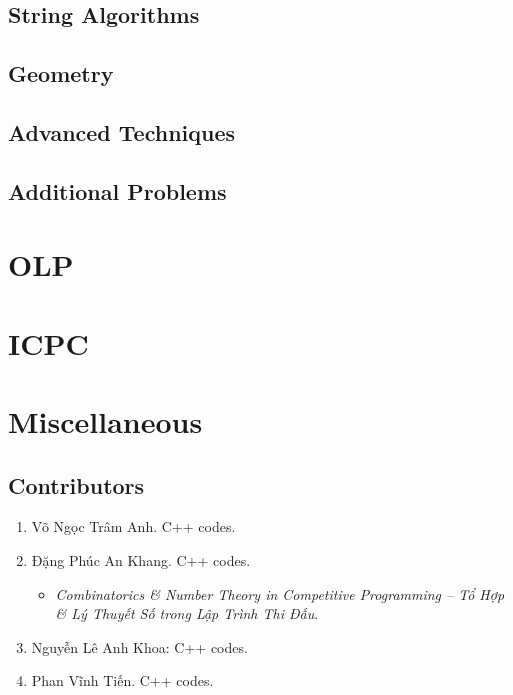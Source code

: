 \documentclass{article}
\begin{document}
\subsection{String Algorithms}

\subsection{Geometry}

\subsection{Advanced Techniques}

\subsection{Additional Problems}


\section{OLP}


\section{ICPC}


\section{Miscellaneous}

\subsection{Contributors}

\begin{enumerate}
	\item {\sc Võ Ngọc Trâm Anh.} C++ codes.
	\item {\sc Đặng Phúc An Khang.} C++ codes.
	\begin{itemize}
		\item {\it Combinatorics \& Number Theory in Competitive Programming -- Tổ Hợp \& Lý Thuyết Số trong Lập Trình Thi Đấu}.
	\end{itemize}
	\item {\sc Nguyễn Lê Anh Khoa}: C++ codes.
	\item {\sc Phan Vĩnh Tiến.} C++ codes.
\end{enumerate}
\end{document}
